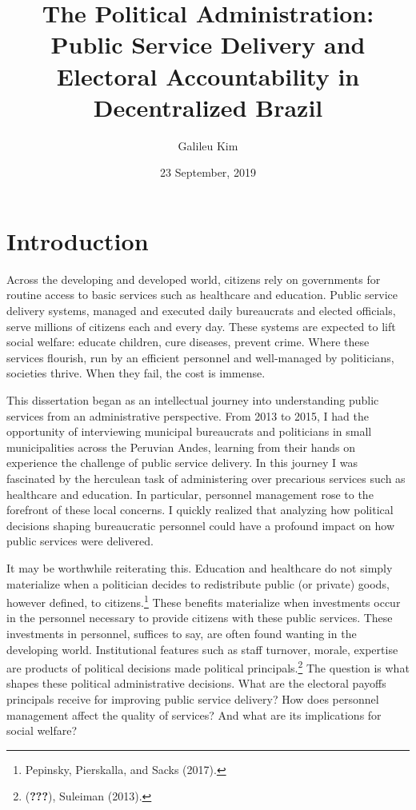 \documentclass[12pt,]{article}
\title{The Political Administration: Public Service Delivery and Electoral
Accountability in Decentralized Brazil}
\author{Galileu Kim}
\date{23 September, 2019}
\let\rmarkdownfootnote\footnote%
\def\footnote{\protect\rmarkdownfootnote}
\begin{document}
\maketitle

\hypertarget{introduction}{%
\section{Introduction}\label{introduction}}

Across the developing and developed world, citizens rely on governments
for routine access to basic services such as healthcare and education.
Public service delivery systems, managed and executed daily bureaucrats
and elected officials, serve millions of citizens each and every day.
These systems are expected to lift social welfare: educate children,
cure diseases, prevent crime. Where these services flourish, run by an
efficient personnel and well-managed by politicians, societies thrive.
When they fail, the cost is immense.

This dissertation began as an intellectual journey into understanding
public services from an administrative perspective. From 2013 to 2015, I
had the opportunity of interviewing municipal bureaucrats and
politicians in small municipalities across the Peruvian Andes, learning
from their hands on experience the challenge of public service delivery.
In this journey I was fascinated by the herculean task of administering
over precarious services such as healthcare and education. In
particular, personnel management rose to the forefront of these local
concerns. I quickly realized that analyzing how political decisions
shaping bureaucratic personnel could have a profound impact on how
public services were delivered.

It may be worthwhile reiterating this. Education and healthcare do not
simply materialize when a politician decides to redistribute public (or
private) goods, however defined, to citizens.\footnote{Pepinsky,
  Pierskalla, and Sacks (2017).} These benefits materialize when
investments occur in the personnel necessary to provide citizens with
these public services. These investments in personnel, suffices to say,
are often found wanting in the developing world. Institutional features
such as staff turnover, morale, expertise are products of political
decisions made political principals.\footnote{({\textbf{???}}), Suleiman
  (2013).} The question is what shapes these political administrative
decisions. What are the electoral payoffs principals receive for
improving public service delivery? How does personnel management affect
the quality of services? And what are its implications for social
welfare?
\end{document}
